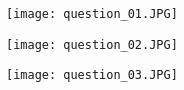 \begin{figure}
    \centering
    \texttt{[image: question\_01.JPG]}
    \label{fig:eda_filtering}
\end{figure}
\begin{figure}
    \centering
    \texttt{[image: question\_02.JPG]}
    \label{fig:eda_filtering}
\end{figure}
\begin{figure}
    \centering
    \texttt{[image: question\_03.JPG]}
    \label{fig:eda_filtering}
\end{figure}